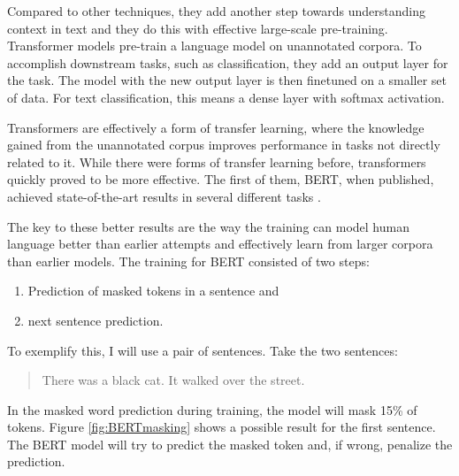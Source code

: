 \documentclass[nofilelist]{cslthse-msc}
\begin{document}
Compared to other techniques, they add another step towards understanding context in text and they do this with effective large-scale pre-training. Transformer models pre-train a language model on unannotated corpora. To accomplish downstream tasks, such as classification, they add an output layer for the task. The model with the new output layer is then finetuned on a smaller set of data. For text classification, this means a dense layer with softmax activation.

Transformers are effectively a form of transfer learning, where the knowledge gained from the unannotated corpus improves performance in tasks not directly related to it. While there were forms of transfer learning before, transformers quickly proved to be more effective. The first of them, BERT, when published, achieved state-of-the-art results in several different tasks \citep{DBLP:journals/corr/abs-1810-04805}.

The key to these better results are the way the training can model human language better than earlier attempts and effectively learn from larger corpora than earlier models. The training for BERT consisted of two steps:
\begin{enumerate}
    \item Prediction of masked tokens in a sentence and
    \item  next sentence prediction.
\end{enumerate}

To exemplify this, I will use a pair of sentences. Take the two sentences:
\begin{quote}
There was a black cat. It walked over the street.
\end{quote}
In the masked word prediction during training, the model will mask 15\% of tokens. Figure \ref{fig:BERTmasking} shows a possible result for the first sentence. The BERT model will try to predict the masked token and, if wrong, penalize the prediction.
\end{document}
